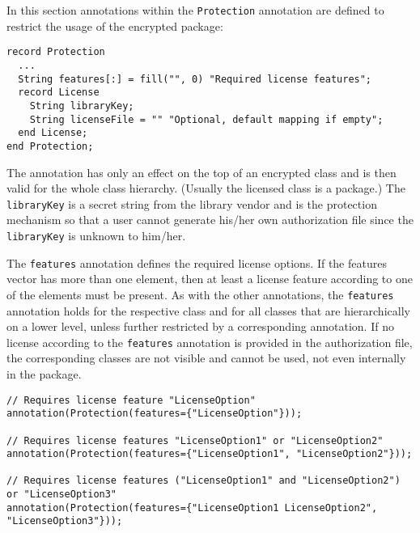 In this section annotations within the \lstinline!Protection! annotation are
defined to restrict the usage of the encrypted package:
\begin{lstlisting}[language=modelica]
record Protection
  ...
  String features[:] = fill("", 0) "Required license features";
  record License
    String libraryKey;
    String licenseFile = "" "Optional, default mapping if empty";
  end License;
end Protection;
\end{lstlisting}
The  annotation has only an effect on the top of an encrypted class and is then valid for the whole class hierarchy.
(Usually the licensed class is a package.)
The \lstinline!libraryKey! is a secret string from the library vendor and is the protection mechanism so that a user cannot generate his/her own authorization file since the \lstinline!libraryKey! is unknown to him/her.

The \lstinline!features! annotation defines the required license options. If the
features vector has more than one element, then at least a license
feature according to one of the elements must be present. As with the
other annotations, the \lstinline!features! annotation holds for the respective
class and for all classes that are hierarchically on a lower level,
unless further restricted by a corresponding annotation. If no license
according to the \lstinline!features! annotation is provided in the
authorization file, the corresponding classes are not visible and cannot
be used, not even internally in the package.

\begin{example}
\begin{lstlisting}[language=modelica]
// Requires license feature "LicenseOption"
annotation(Protection(features={"LicenseOption"}));

// Requires license features "LicenseOption1" or "LicenseOption2"
annotation(Protection(features={"LicenseOption1", "LicenseOption2"}));

// Requires license features ("LicenseOption1" and "LicenseOption2") or "LicenseOption3"
annotation(Protection(features={"LicenseOption1 LicenseOption2", "LicenseOption3"}));
\end{lstlisting}
\end{example}

